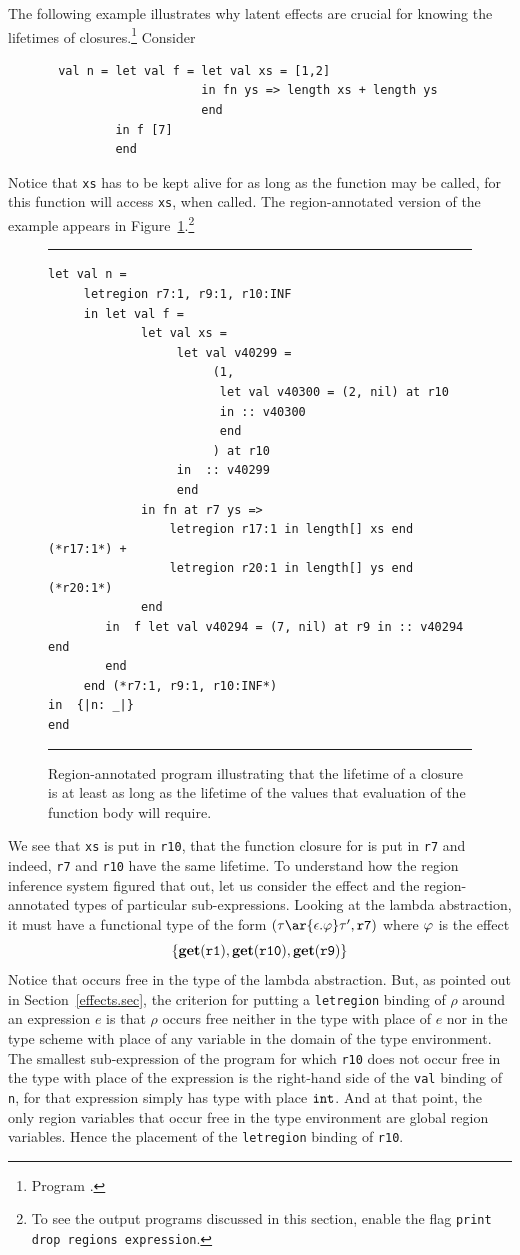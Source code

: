 \documentclass[12pt]{book}
\begin{document}
The following example illustrates why latent effects are crucial for
knowing the lifetimes of closures.\footnote{Program .} Consider
\begin{verbatim}
       val n = let val f = let val xs = [1,2]
                           in fn ys => length xs + length ys
                           end
               in f [7]
               end
\end{verbatim}
Notice that {\tt xs} has to be kept alive for as long as the
function  may be called, for this function
will access {\tt xs}, when called.
The region-annotated version of the example appears in Figure~\ref{lambda1.fig}.\footnote{To
see the output programs discussed in this section, enable the flag
\texttt{print drop regions expression}.}
\begin{figure}
\hrule \medskip
\begin{verbatim}
let val n = 
     letregion r7:1, r9:1, r10:INF 
     in let val f = 
             let val xs = 
                  let val v40299 = 
                       (1, 
                        let val v40300 = (2, nil) at r10 
                        in :: v40300 
                        end 
                       ) at r10
                  in  :: v40299
                  end 
             in fn at r7 ys => 
                 letregion r17:1 in length[] xs end (*r17:1*) + 
                 letregion r20:1 in length[] ys end (*r20:1*)
             end 
        in  f let val v40294 = (7, nil) at r9 in :: v40294 end 
        end  
     end (*r7:1, r9:1, r10:INF*)
in  {|n: _|}
end 
\end{verbatim}
\caption{Region-annotated program illustrating that the lifetime of
a closure is at least as long as the lifetime of the values that evaluation
of the function body will require.}
\medskip
\hrule
\label{lambda1.fig}
\end{figure}
We see that {\tt xs} is put in {\tt r10}, that the
function closure for  is put in {\tt r7}
and indeed, {\tt r7} and {\tt r10} have the
same lifetime. To understand how the region inference system figured that out, 
let us consider the effect and the 
region-annotated types of particular sub-expressions. Looking at the lambda
abstraction, it must have a functional type of the form 
$(\tau\ar{\epsilon.\rea}\tau', {\tt r7})$ where $\varphi$ is the
effect
$$\{\mathop{\bf get}\nolimits(\hbox{\tt r1}), \mathop{\bf get}\nolimits(\hbox{\tt r10}), \mathop{\bf get}\nolimits(\hbox{\tt r9})\}$$
Notice that  occurs free in the type of the
lambda abstraction. But, as pointed out in Section~\ref{effects.sec},
the criterion
for putting a {\tt letregion} binding of $\rho$ around an expression $e$
is that $\rho$ occurs free neither in the type with place of $e$ nor
in the type scheme with place of any variable in the domain of the
type environment. The smallest sub-expression
of the program for which {\tt r10} does not occur free in
the type with place of the expression is the right-hand side 
of the {\tt val} binding of {\tt n}, for that expression
simply has type with place $\hbox{\tt int}$.
And at that point, the only region variables that occur free in
the type environment are global region variables.
Hence the placement of the {\tt letregion} binding of {\tt r10}.
\end{document}
